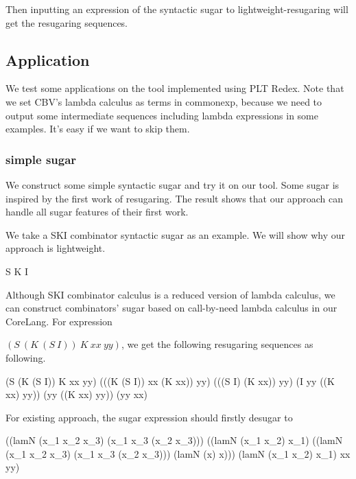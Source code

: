 Then inputting an expression of the syntactic sugar to lightweight-resugaring will get the resugaring sequences.

\subsection{Application}

We test some applications on the tool implemented using PLT Redex. Note that we set CBV's lambda calculus as terms in commonexp, because we need to output some intermediate sequences including lambda expressions in some examples. It's easy if we want to skip them.

\subsubsection{simple sugar}
\label{mark:simple}

We construct some simple syntactic sugar and try it on our tool. Some sugar is inspired by the first work of resugaring\cite{resugaring}. The result shows that our approach can handle all sugar features of their first work.

We take a SKI combinator syntactic sugar as an example. We will show why our approach is lightweight.
\begin{Codes}
	S 
	K 
	I 
\end{Codes}



Although SKI combinator calculus is a reduced version of lambda calculus, we can construct combinators' sugar based on call-by-need lambda calculus in our CoreLang. For expression

 $(S~(K~(S~I))~K~xx~yy)$, we get the following resugaring sequences as following.
\begin{Codes}
    (S (K (S I)) K xx yy)
\OneStep (((K (S I)) xx (K xx)) yy)
\OneStep (((S I) (K xx)) yy)
\OneStep (I yy ((K xx) yy))
\OneStep (yy ((K xx) yy))
\OneStep (yy xx)
\end{Codes}


For existing approach, the sugar expression should firstly desugar to
\begin{Codes}
((lamN
   (x_{1} x_{2} x_{3})
   (x_{1} x_{3} (x_{2} x_{3})))
  ((lamN (x_{1} x_{2}) x_{1})
   ((lamN
     (x_{1} x_{2} x_{3})
     (x_{1} x_{3} (x_{2} x_{3})))
    (lamN (x) x)))
  (lamN (x_{1} x_{2}) x_{1})
  xx yy)
\end{Codes}

